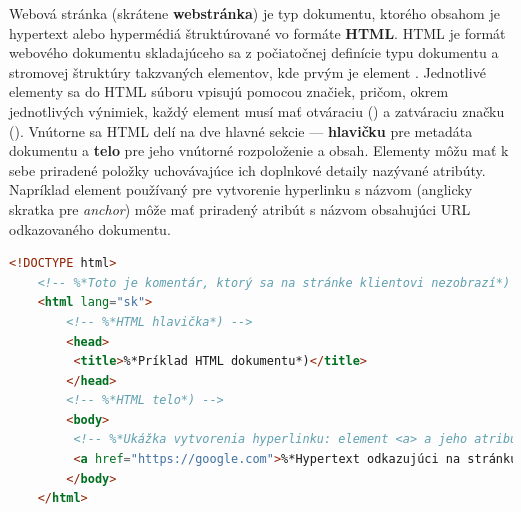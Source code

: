 Webová stránka (skrátene \textbf{webstránka}) je typ dokumentu, ktorého obsahom je hypertext alebo hypermédiá štruktúrované vo formáte \textbf{HTML}.
HTML je formát webového dokumentu skladajúceho sa z počiatočnej definície typu dokumentu a stromovej štruktúry takzvaných elementov, kde prvým je element . 
Jednotlivé elementy sa do HTML súboru vpisujú pomocou značiek, pričom, okrem jednotlivých výnimiek, 
každý element musí mať otváraciu () a zatváraciu značku ().
Vnútorne sa HTML delí na dve hlavné sekcie --- \textbf{hlavičku} pre metadáta dokumentu a \textbf{telo} pre jeho vnútorné rozpoloženie a obsah.
Elementy môžu mať k sebe priradené položky uchovávajúce ich doplnkové detaily nazývané atribúty. 
Napríklad element používaný pre vytvorenie hyperlinku s názvom  (anglicky skratka pre \textit{anchor}) 
môže mať priradený atribút s názvom  obsahujúci URL odkazovaného dokumentu.


\begin{center}
\centering
\begin{lstlisting}[caption={\centering Základná štruktúra HTML dokumentu. 
    HTML obsahuje počiatočnú definíciu typu dokumentu (\code{<!DOCTYPE html>}), hlavičku, telo, hyperlink a popisné komentáre.},
label=listing:html-struktura, 
language=HTML, 
frame=tb,
xleftmargin=.05\textwidth, 
xrightmargin=.05\textwidth]
    <!DOCTYPE html>
    <!-- %*Toto je komentár, ktorý sa na stránke klientovi nezobrazí*) -->
    <html lang="sk">       
        <!-- %*HTML hlavička*) -->
        <head>
         <title>%*Príklad HTML dokumentu*)</title>
        </head>
        <!-- %*HTML telo*) -->
        <body>
         <!-- %*Ukážka vytvorenia hyperlinku: element <a> a jeho atribút href*) -->
         <a href="https://google.com">%*Hypertext odkazujúci na stránku google*)</a>
        </body>
    </html>
\end{lstlisting}
\end{center}

